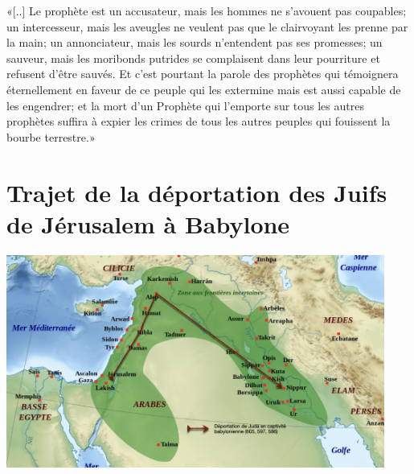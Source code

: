 \decalage «[..] Le prophète est un accusateur, mais les hommes ne s'avouent pas coupables; un intercesseur, mais les aveugles ne veulent pas que le clairvoyant les prenne par la main; un annonciateur, mais les sourds n'entendent pas ses promesses; un sauveur, mais les moribonds putrides se complaisent dans leur pourriture et refusent d'être sauvés. Et c'est pourtant la parole des prophètes qui témoignera éternellement en faveur de ce peuple qui les extermine mais est aussi capable de les engendrer; et la mort d'un Prophète qui l'emporte sur tous les autres prophètes suffira à expier les crimes de tous les autres peuples qui fouissent la bourbe terrestre.»\par
\vspace{1.5em}
\section*{Trajet de la déportation des Juifs de Jérusalem à Babylone}
\begin{center}
\includegraphics[height=7cm]{../assets/deportation.jpg} \\
\end{center}
